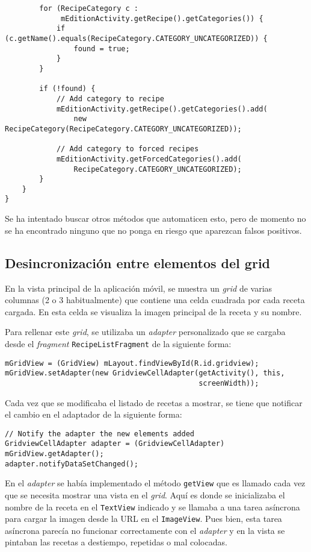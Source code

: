 \begin{verbatim}
        for (RecipeCategory c :
             mEditionActivity.getRecipe().getCategories()) {
            if (c.getName().equals(RecipeCategory.CATEGORY_UNCATEGORIZED)) {
                found = true;
            }
        }

        if (!found) {
            // Add category to recipe
            mEditionActivity.getRecipe().getCategories().add(
                new RecipeCategory(RecipeCategory.CATEGORY_UNCATEGORIZED));

            // Add category to forced recipes
            mEditionActivity.getForcedCategories().add(
                RecipeCategory.CATEGORY_UNCATEGORIZED);
        }
    }
}
\end{verbatim}

Se ha intentado buscar otros métodos que automaticen esto, pero de momento no se
ha encontrado ninguno que no ponga en riesgo que aparezcan falsos positivos.


\subsection{Desincronización entre elementos del grid}

En la vista principal de la aplicación móvil, se muestra un \textit{grid}
de varias columnas (2 o 3 habitualmente) que contiene una celda cuadrada por
cada receta cargada. En esta celda se visualiza la imagen principal de la
receta y su nombre.

Para rellenar este \textit{grid}, se utilizaba un \textit{adapter} personalizado
que se cargaba desde el \textit{fragment} \texttt{RecipeListFragment} de la
siguiente forma:

\begin{verbatim}
mGridView = (GridView) mLayout.findViewById(R.id.gridview);
mGridView.setAdapter(new GridviewCellAdapter(getActivity(), this,
                                             screenWidth));
\end{verbatim}

Cada vez que se modificaba el listado de recetas a mostrar, se tiene que
notificar el cambio en el adaptador de la siguiente forma:

\begin{verbatim}
// Notify the adapter the new elements added
GridviewCellAdapter adapter = (GridviewCellAdapter) mGridView.getAdapter();
adapter.notifyDataSetChanged();
\end{verbatim}

En el \textit{adapter} se había implementado el método \texttt{getView} que es
llamado cada vez que se necesita mostrar una vista en el \textit{grid}. Aquí es
donde se inicializaba el nombre de la receta en el \texttt{TextView} indicado
y se llamaba a una tarea asíncrona para cargar la imagen desde la URL en el
\texttt{ImageView}. Pues bien, esta tarea asíncrona parecía no funcionar
correctamente con el \textit{adapter} y en la vista se pintaban las recetas
a destiempo, repetidas o mal colocadas.

